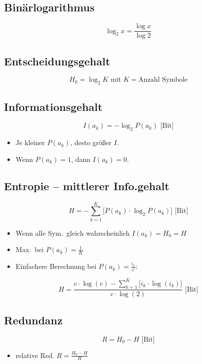 \begin{multicols}{2}

\subsection*{Binärlogarithmus}
\[
    \log_2{x} = \frac{\log{x}}{\log{2}}
\]

\subsection*{Entscheidungsgehalt}
\[
    H_0 = \log_2{K} \mbox{ mit } K = \text{Anzahl Symbole}
\]

\subsection*{Informationsgehalt}
\begin{minipage}{\columnwidth}
\[
    I(a_k) = -\log_2{P(a_k)} \mbox{ [Bit]}
\]
\begin{itemize}
	\setlength{\parskip}{0pt}
	\setlength{\itemsep}{0pt}
	\item Je kleiner $P(a_k)$, desto größer $I$.
	\item Wenn $P(a_k) = 1$, dann $I(a_k) = 0$.
\end{itemize}
\end{minipage}

\subsection*{Entropie -- mittlerer Info.gehalt}
\begin{minipage}{\columnwidth}
\[
    H = - \sum_{k=1}^{K} \bigg[ P(a_k) \cdot \log_2{P(a_k)} \bigg] \mbox{ [Bit]}
\]
\begin{itemize}
	\setlength{\parskip}{0pt}
	\setlength{\itemsep}{0pt plus 1pt}
	\item Wenn alle Sym.\ gleich wahrscheinlich $I(a_k) = H_0 = H$
	\item Max.\ bei $P(a_k) = \frac{1}{K}$
    \item Einfachere Berechnung bei $P(a_k) = \frac{i_k}{c}$:
\end{itemize}
\[
    H = \frac{c \cdot \log(c) - \sum\limits_{k=1}^{K} \bigg[ i_k \cdot
        \log(i_k) \bigg]}{c \cdot \log(2)} \mbox{ [Bit]}
\]
\end{minipage}

\subsection*{Redundanz}
\begin{minipage}{\columnwidth}
\[
    R = H_0 - H \mbox{ [Bit]}
\]
\begin{itemize}
	\setlength{\parskip}{0pt}
	\setlength{\itemsep}{0pt plus 1pt}
	\item relative Red. $\displaystyle R = \frac{H_0 - H}{H}$
\end{itemize}
\end{minipage}


\end{multicols}
